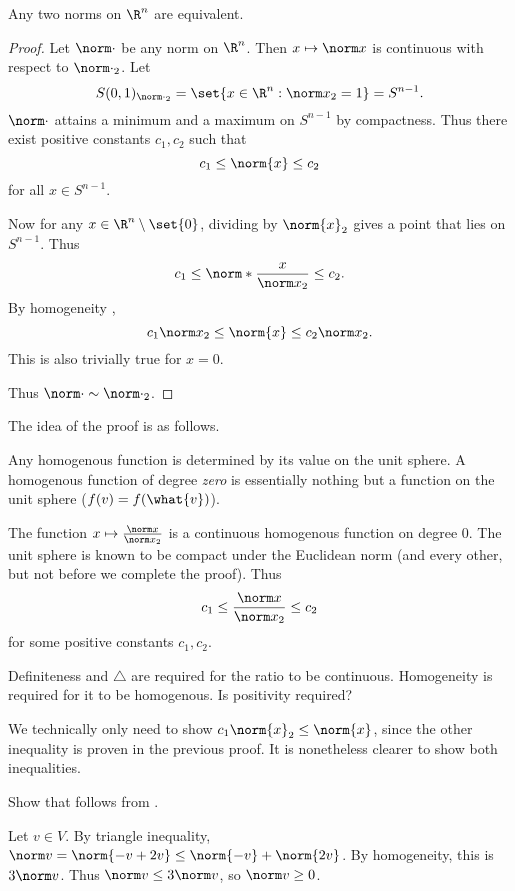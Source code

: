 \begin{theorem*} \label{thm:norm:eq}
    Any two norms on $\R^n$ are equivalent.
\end{theorem*}
\begin{proof}
    Let $\norm\cdot$ be any norm on $\R^n$.
    Then $x \mapsto \norm x$ is continuous with respect to ${\norm\cdot}_2$.
    Let \[
        S(0, 1)_{{\norm\cdot}_2} = \set{x \in \R^n : {\norm x}_2 = 1}
                      = S^{n-1}.
    \] $\norm\cdot$ attains a minimum and a maximum on $S^{n-1}$
    by compactness.
    Thus there exist positive constants $c_1, c_2$ such that \[
        c_1 \le \norm{x} \le c_2
    \] for all $x \in S^{n-1}$.

    Now for any $x \in \R^n \setminus \set{0}$,
    dividing by $\norm{x}_2$ gives a point that lies on $S^{n-1}$.
    Thus \[
        c_1 \le \norm*{\frac{x}{{\norm x}_2}} \le c_2.
    \] By homogeneity , \[
        c_1 {\norm x}_2 \le \norm{x} \le c_2 {\norm x}_2.
    \] This is also trivially true for $x = 0$.

    Thus $\norm\cdot \sim {\norm\cdot}_2$.
\end{proof}
\begin{remark}
    The idea of the proof is as follows.

    Any homogenous function is determined by its value on the unit sphere.
    A homogenous function of degree \emph{zero} is essentially nothing but
    a function on the unit sphere ($f(v) = f(\what{v})$).

    The function $x \mapsto \frac{\norm x}{{\norm x}_2}$ is a
    continuous homogenous function on degree $0$.
    The unit sphere is known to be compact under the Euclidean norm
    (and every other, but not before we complete the proof).
    Thus \[
        c_1 \le \frac{\norm x}{{\norm x}_2} \le c_2
    \] for some positive constants $c_1, c_2$.

    Definiteness and $\triangle$ are required for the ratio to be
    continuous.
    Homogeneity is required for it to be homogenous.
    Is positivity required? %
\end{remark}
\begin{remark}
    We technically only need to show $c_1 \norm{x}_2 \le \norm{x}$,
    since the other inequality is proven in the previous proof.
    It is nonetheless clearer to show both inequalities.
\end{remark}

\begin{exercise*}[self]
    Show that  follows from
    .
\end{exercise*}
\begin{solution}
    Let $v \in V$.
    By triangle inequality,
    $\norm v = \norm{-v + 2v} \le \norm{-v} + \norm{2v}$.
    By homogeneity, this is $3\norm v$.
    Thus $\norm v \le 3\norm v$, so $\norm v \ge 0$.
\end{solution}

